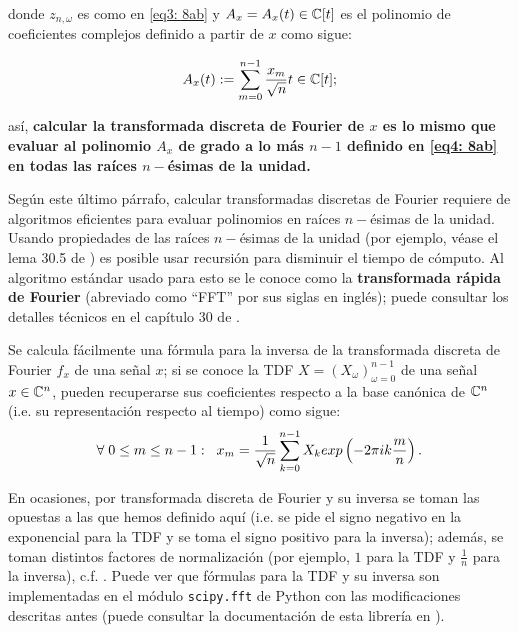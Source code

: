 \noindent
donde $z_{n, \omega}$ es como en \eqref{eq3: 8ab} y 
$A_{x} = A_{x}(t) \in \mathbb{C}[t]$ es el polinomio de 
coeficientes complejos definido 
a partir de $x$ como sigue:

	\begin{equation}
		\label{eq4: 8ab}
		A_{x}(t) := \sum\limits_{m=0}^{n-1}\frac{x_{m}}{\sqrt{n}} t\in \mathbb{C}[t];
	\end{equation}

\noindent
así, \textbf{calcular la transformada
discreta de Fourier de $x$ es lo mismo que evaluar al polinomio 
$A_{x}$ de grado a lo más $n-1$ definido en \eqref{eq4: 8ab} en todas las raíces
$n-$ésimas de la unidad.} 


\begin{nota}
Según este último párrafo, calcular transformadas discretas
de Fourier requiere de algoritmos eficientes para evaluar
polinomios en raíces $n-$ésimas de la unidad. Usando propiedades
de las raíces $n-$ésimas de la unidad (por ejemplo,
véase el lema 30.5 de \cite{algorithms}) 
es posible usar recursión para disminuir
el tiempo de cómputo. Al algoritmo estándar usado para
esto se le conoce como la \textbf{transformada rápida de 
Fourier} (abreviado como ``FFT'' por sus siglas en inglés);
puede consultar los detalles técnicos en el capítulo
30 de \cite{algorithms}.
\end{nota}

\begin{nota}
Se calcula fácilmente una fórmula para la 
inversa de la transformada discreta de Fourier 
$f_{x}$ de una señal $x$; si
se conoce la TDF $X = (X_{\omega})_{\omega=0}^{n-1}$
de una señal $x \in \mathbb{C}^{n}$, pueden recuperarse sus coeficientes
respecto a la base canónica de $\mathbb{C}^{n}$ (i.e. su representación
respecto al tiempo)
como sigue:
\begin{equation}
\label{eq: TDFI}
\forall \hspace{0.1cm} 0 \leq m \leq n-1:
\hspace{0.2cm}
x_{m} = \frac{1}{\sqrt{n}} 
\suma{k=0}{n-1}{
X_{k} exp \left( 
-2 \pi i k \frac{m}{n}
\right).
}
\end{equation}

En ocasiones, por transformada discreta de Fourier y su 
inversa se toman las opuestas a las que hemos definido aquí
(i.e. se pide el signo negativo en la exponencial 
para la TDF y se toma el signo positivo para la inversa); además,
se toman distintos factores de normalización
(por ejemplo, $1$ para la TDF y $\frac{1}{n}$ para la
inversa), c.f. \cite{TDFwiki}. Puede ver que fórmulas
para la TDF y su inversa son implementadas en el 
módulo \texttt{scipy.fft} de Python con las modificaciones descritas
antes (puede consultar la documentación de esta librería en
\cite{FFTscipy}).
\end{nota}

